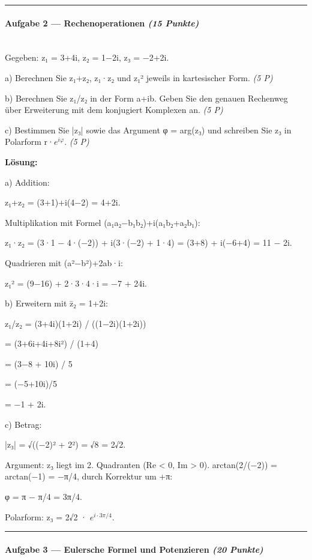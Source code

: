 \documentclass[11pt, a4paper]{article}
\begin{document}
\noindent\textcolor{rulegray}{\rule{\linewidth}{0.4pt}}


\paragraph{Aufgabe 2 — Rechenoperationen \textit{(15 Punkte)}}\mbox{}\\[2pt]

Gegeben: z₁ = 3+4i, z₂ = 1−2i, z₃ = −2+2i.


a) Berechnen Sie z₁+z₂, z₁·z₂ und z₁² jeweils in kartesischer Form. \textit{(5 P)}


b) Berechnen Sie z₁/z₂ in der Form a+ib. Geben Sie den genauen Rechenweg über Erweiterung mit dem konjugiert Komplexen an. \textit{(5 P)}


c) Bestimmen Sie |z₃| sowie das Argument φ = arg(z₃) und schreiben Sie z₃ in Polarform r·$e^{iφ}$. \textit{(5 P)}


\textbf{Lösung:}


a) Addition:

z₁+z₂ = (3+1)+i(4−2) = 4+2i.


Multiplikation mit Formel (a₁a₂−b₁b₂)+i(a₁b₂+a₂b₁):

z₁·z₂ = (3·1 − 4·(−2)) + i(3·(−2) + 1·4) = (3+8) + i(−6+4) = 11 − 2i.


Quadrieren mit (a²−b²)+2ab·i:

z₁² = (9−16) + 2·3·4·i = −7 + 24i.


b) Erweitern mit z̄₂ = 1+2i:

z₁/z₂ = (3+4i)(1+2i) / ((1−2i)(1+2i))

= (3+6i+4i+8i²) / (1+4)

= (3−8 + 10i) / 5

= (−5+10i)/5

= −1 + 2i.


c) Betrag:

|z₃| = √((−2)² + 2²) = √8 = 2√2.


Argument: z₃ liegt im 2. Quadranten (Re < 0, Im > 0). arctan(2/(−2)) = arctan(−1) = −π/4, durch Korrektur um +π:

φ = π − π/4 = 3π/4.


Polarform: z₃ = 2√2 · $e^{i·3π/4}$.



\noindent\textcolor{rulegray}{\rule{\linewidth}{0.4pt}}


\paragraph{Aufgabe 3 — Eulersche Formel und Potenzieren \textit{(20 Punkte)}}\mbox{}\\[2pt]
\end{document}
